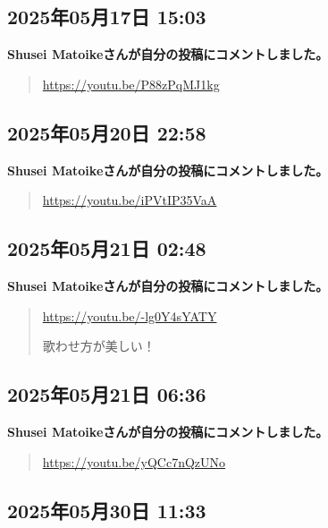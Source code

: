 \subsection*{2025年05月17日 15:03}

\textbf{Shusei Matoikeさんが自分の投稿にコメントしました。}

\begin{quote}
\url{https://youtu.be/P88zPqMJ1kg}
\end{quote}

\subsection*{2025年05月20日 22:58}

\textbf{Shusei Matoikeさんが自分の投稿にコメントしました。}

\begin{quote}
\url{https://youtu.be/iPVtIP35VaA}
\end{quote}

\subsection*{2025年05月21日 02:48}

\textbf{Shusei Matoikeさんが自分の投稿にコメントしました。}

\begin{quote}
\url{https://youtu.be/-lg0Y4sYATY}

歌わせ方が美しい！
\end{quote}

\subsection*{2025年05月21日 06:36}

\textbf{Shusei Matoikeさんが自分の投稿にコメントしました。}

\begin{quote}
\url{https://youtu.be/yQCc7nQzUNo}
\end{quote}

\subsection*{2025年05月30日 11:33}

